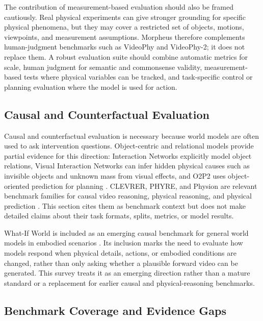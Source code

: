 The contribution of measurement-based evaluation should also be framed cautiously. Real physical experiments can give stronger grounding for specific physical phenomena, but they may cover a restricted set of objects, motions, viewpoints, and measurement assumptions. Morpheus therefore complements human-judgment benchmarks such as VideoPhy and VideoPhy-2; it does not replace them. A robust evaluation suite should combine automatic metrics for scale, human judgment for semantic and commonsense validity, measurement-based tests where physical variables can be tracked, and task-specific control or planning evaluation where the model is used for action.

\subsection{Causal and Counterfactual Evaluation}

Causal and counterfactual evaluation is necessary because world models are often used to ask intervention questions. Object-centric and relational models provide partial evidence for this direction: Interaction Networks explicitly model object relations, Visual Interaction Networks can infer hidden physical causes such as invisible objects and unknown mass from visual effects, and O2P2 uses object-oriented prediction for planning \cite{battaglia2016_interaction_networks_prov,watters2017_visual_interaction_networks_prov,janner2019_o2p2_prov}. CLEVRER, PHYRE, and Physion are relevant benchmark families for causal video reasoning, physical reasoning, and physical prediction \cite{bakhtin2019_phyre_prov,yi2020_clevrer_prov,bear2021_physion_prov}. This section cites them as benchmark context but does not make detailed claims about their task formats, splits, metrics, or model results.

What-If World is included as an emerging causal benchmark for general world models in embodied scenarios \cite{cai2026whatifworld_prov}. Its inclusion marks the need to evaluate how models respond when physical details, actions, or embodied conditions are changed, rather than only asking whether a plausible forward video can be generated. This survey treats it as an emerging direction rather than a mature standard or a replacement for earlier causal and physical-reasoning benchmarks.

\subsection{Benchmark Coverage and Evidence Gaps}

